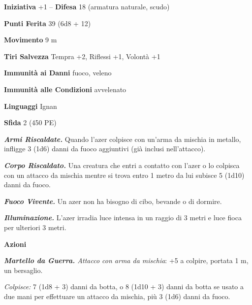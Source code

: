 \begin{multicols}{2}
\textbf{Iniziativa} +1 -- \textbf{Difesa} 18 (armatura naturale, scudo)

\textbf{Punti Ferita} 39 (6d8 + 12)

\textbf{Movimento} 9 m

\textbf{Tiri Salvezza} Tempra +2, Riflessi +1, Volontà +1

\textbf{Immunità ai Danni} fuoco, veleno

\textbf{Immunità alle Condizioni} avvelenato

\textbf{Linguaggi} Ignan

\textbf{Sfida} 2 (450 PE)

\emph{\textbf{Armi Riscaldate.}} Quando l'azer colpisce con un'arma da mischia in metallo, infligge 3 (1d6) danni da fuoco aggiuntivi (già inclusi nell'attacco).

\emph{\textbf{Corpo Riscaldato.}} Una creatura che entri a contatto con l'azer o lo colpisca con un attacco da mischia mentre si trova entro 1 metro da lui subisce 5 (1d10) danni da fuoco.

\emph{\textbf{Fuoco Vivente.}} Un azer non ha bisogno di cibo, bevande o di dormire.

\emph{\textbf{Illuminazione.}} L'azer irradia luce intensa in un raggio di 3 metri e luce fioca per ulteriori 3 metri.

\textbf{Azioni}

\emph{\textbf{Martello da Guerra.} Attacco con arma da mischia}: +5 a colpire, portata 1 m, un bersaglio.

\emph{Colpisce:} 7 (1d8 + 3) danni da botta, o 8 (1d10 + 3) danni da botta se usato a due mani per effettuare un attacco da mischia, più 3 (1d6) danni da fuoco.


\end{multicols}
